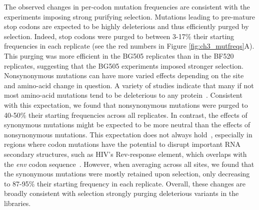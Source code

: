 \documentclass[9pt,lineno]{elife}
\begin{document}
The observed changes in per-codon mutation frequencies are consistent with the experiments imposing strong purifying selection.
Mutations leading to pre-mature stop codons are expected to be highly deleterious and thus efficiently purged by selection.
Indeed, stop codons were purged to between 3-17\% their starting frequencies in each replicate (see the red numbers in Figure \ref{fig:ch3_mutfreqs}A).
This purging was more efficient in the BG505 replicates than in the BF520 replicates, suggesting that the BG505 experiments imposed stronger selection.
Nonsynonymous mutations can have more varied effects depending on the site and amino-acid change in question.
A variety of studies indicate that many if not most amino-acid mutations tend to be deleterious to any protein~\cite{guo2004protein,shafikhani1997generation,bloom2005thermodynamic}.
Consistent with this expectation, we found that nonsynonymous mutations were purged to 40-50\% their starting frequencies across all replicates.
In contrast, the effects of synonymous mutations might be expected to be more neutral than the effects of nonsynonymous mutations.
This expectation does not always hold~\cite{parmley2006evidence,cuevas2012fitness,subramaniam2013serine,zanini2013quantifying}, especially in regions where codon mutations have the potential to disrupt important RNA secondary structures, such as HIV's Rev-response element, which overlaps with the \textit{env} codon sequence~\cite{fernandes2012hiv,haddox2016experimental}.
However, when averaging across all sites, we found that the synonymous mutations were mostly retained upon selection, only decreasing to 87-95\% their starting frequency in each replicate.
Overall, these changes are broadly consistent with selection strongly purging deleterious variants in the libraries.
\end{document}
